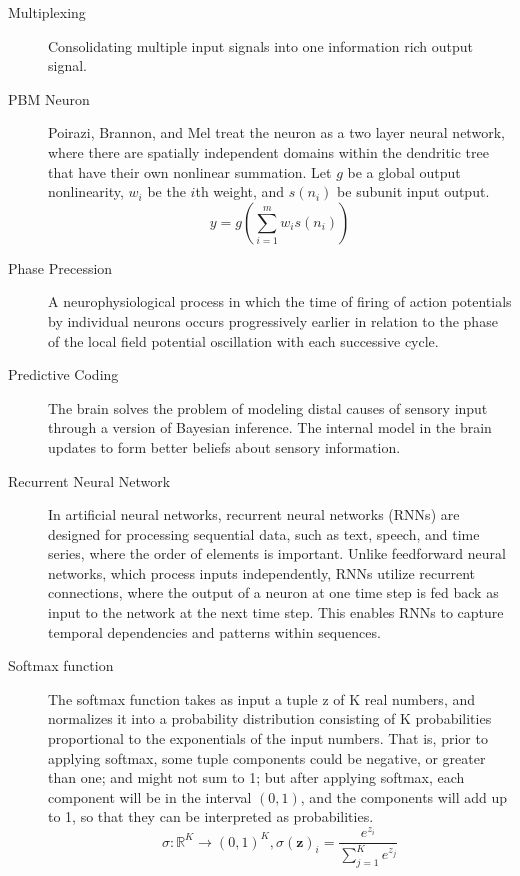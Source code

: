\documentclass[11pt, a4paper]{article}
\begin{document}
\begin{description}
    \item[Multiplexing] Consolidating multiple input signals into one information rich output signal.

    \item[PBM Neuron] Poirazi, Brannon, and Mel treat the neuron as a two layer neural network, where there are spatially independent domains within the dendritic tree that have their own nonlinear summation. Let $g$ be a global output nonlinearity, $w_i$ be the $i$th weight, and $s(n_i)$ be subunit input output. 
    \begin{equation}
        y  =g \left(\sum_{i=1}^m w_i s(n_i) \right)
    \end{equation}

    \item[Phase Precession] A neurophysiological process in which the time of firing of action potentials by individual neurons occurs progressively earlier in relation to the phase of the local field potential oscillation with each successive cycle.

    \item[Predictive Coding] The brain solves the problem of modeling distal causes of sensory input through a version of Bayesian inference. The internal model in the brain updates to form better beliefs about sensory information.

    \item[Recurrent Neural Network] In artificial neural networks, recurrent neural networks (RNNs) are designed for processing sequential data, such as text, speech, and time series, where the order of elements is important. Unlike feedforward neural networks, which process inputs independently, RNNs utilize recurrent connections, where the output of a neuron at one time step is fed back as input to the network at the next time step. This enables RNNs to capture temporal dependencies and patterns within sequences.

    \item[Softmax function] The softmax function takes as input a tuple z of K real numbers, and normalizes it into a probability distribution consisting of K probabilities proportional to the exponentials of the input numbers. That is, prior to applying softmax, some tuple components could be negative, or greater than one; and might not sum to 1; but after applying softmax, each component will be in the interval $(0,1)$, and the components will add up to 1, so that they can be interpreted as probabilities.
    \begin{equation}
        \sigma : \mathbb{R}^K \to (0,1)^K, \sigma(\mathbf{z})_i = \frac{e^{z_i}}{\sum_{j=1}^K e^{z_j}}
    \end{equation}


\end{description}
\end{document}
